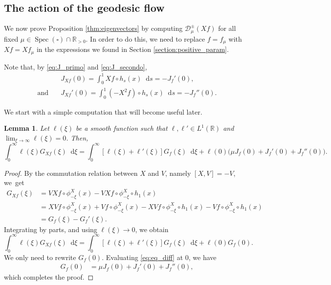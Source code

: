 \documentclass[JEP,XML,SOM,NoEqCountersInSection,Unicode,published]{cedram}
\newcommand \R{\mathbb{R}}
\newcommand*{\diff}{\mathop{}\!\mathrm{d}}
\newcommand{\Dpmp}[1]{\mathcal{D}_\mu^{\pm}(#1)}
\DeclareMathOperator{\Spec}{Spec}
\newtheorem {lemma}[theorem]{Lemma}
\theoremstyle{definition}
\begin{document}
\subsection{The action of the geodesic flow}\label{section:geo_action}

We now prove Proposition \ref{thm:eigenvectors} by computing $\Dpmp{Xf}$ for all fixed $\mu \in \Spec(\square) \cap \R_{>0}$.
In order to do this, we need to replace $f=f_\mu$ with $Xf= Xf_\mu$ in the expressions we found in Section \ref{section:positive_param}.

Note that, by \eqref{eq:J_primo} and \eqref{eq:J_secondo},
\begin{equation}\label{eq:JX}
\begin{split}
&J_{Xf}(0) = \int_0^1 Xf \circ h_s(x) \diff s = -J_f'(0),\\
\text{and}\quad &J_{Xf}'(0)= \int_0^1 (-X^2f) \circ h_s(x) \diff s =- J_f''(0).
\end{split}
\end{equation}

We start with a simple computation that will become useful later.
\begin{lemma}\label{lemma:aGx}
Let $\ell(\xi)$ be a smooth function such that $\ell, \ell' \!\!\in\! L^1(\R)$ and \hbox{$\lim_{\xi \to \infty}\!\ell(\xi)\!=\!0$}. Then,
\[
\int_0^\infty \ell(\xi) G_{Xf}(\xi) \diff \xi = \int_0^\infty [\ell(\xi)+\ell'(\xi)] G_f(\xi) \diff \xi + \ell(0)\bigl(\mu J_f(0) + J_f'(0) + J_f''(0) \bigr).
\]
\end{lemma}
\begin{proof}
By the commutation relation between $X$ and $V$, namely $[X,V]=-V$, we~get
\begin{equation*}
\begin{split}
G_{Xf}(\xi) &= VXf \circ \phi^X_{-\xi}(x) - VXf \circ \phi^X_{-\xi} \circ h_1(x) \\
&= XVf \circ \phi^X_{-\xi}(x) +Vf \circ \phi^X_{-\xi}(x) - XVf \circ \phi^X_{-\xi} \circ h_1(x) -Vf \circ \phi^X_{-\xi} \circ h_1(x) \\
&= G_f(\xi) - G_f'(\xi).
\end{split}
\end{equation*}
Integrating by parts, and using $\ell(\xi) \to 0$, we obtain
\[
\int_0^\infty \ell(\xi) G_{Xf}(\xi) \diff \xi = \int_0^\infty [\ell(\xi)+\ell'(\xi)] G_f(\xi) \diff \xi + \ell(0)G_f(0).
\]
We only need to rewrite $G_f(0)$. Evaluating \eqref{eq:eq_diff} at $0$, we have
\begin{equation*}
\begin{split}
G_f(0) &=\mu J_f(0) + J_f'(0) + J_f''(0),
\end{split}
\end{equation*}
which completes the proof.
\end{proof}
\end{document}

